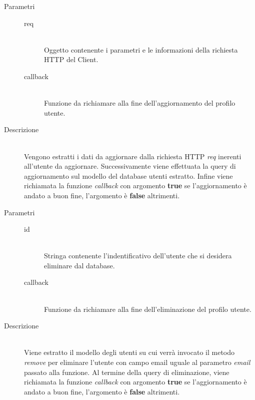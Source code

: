 \begin{description}
\begin{mldescription}
 		 \hfill
 			\begin{description}
 				\item[Parametri] \hfill
 					\begin{description}
 						\item[req] \hfill \\
 							Oggetto contenente i parametri e le informazioni della richiesta HTTP del Client.
 						\item[callback] \hfill \\
 							Funzione da richiamare alla fine dell'aggiornamento del profilo utente.
 					\end{description}
 				\item[Descrizione] \hfill \\
 				Vengono estratti i dati da aggiornare dalla richiesta HTTP \textit{req} inerenti all'utente da aggiornare. Successivamente viene effettuata la query di aggiornamento sul modello del database utenti estratto. Infine viene richiamata la funzione \textit{callback} con argomento \textbf{true} se l'aggiornamento è andato a buon fine, l'argomento è \textbf{false} altrimenti.
 			\end{description}
 			
 		 \hfill
 		 			\begin{description}
 		 				\item[Parametri] \hfill
 		 					\begin{description}
 		 						\item[id] \hfill \\
 		 							Stringa contenente l'indentificativo dell'utente che si desidera eliminare dal database.
 		 						\item[callback] \hfill \\
 		 							Funzione da richiamare alla fine dell'eliminazione del profilo utente.
 		 					\end{description}
 		 				\item[Descrizione] \hfill \\
 		 				Viene estratto il modello degli utenti su cui verrà invocato il metodo \textit{remove} per eliminare l'utente con campo email uguale al parametro \textit{email} passato alla funzione. Al termine della query di eliminazione, viene richiamata la funzione \textit{callback} con argomento \textbf{true} se l'aggiornamento è andato a buon fine, l'argomento è \textbf{false} altrimenti.
 		 			\end{description}
 			
 	\end{mldescription}
\end{description}


